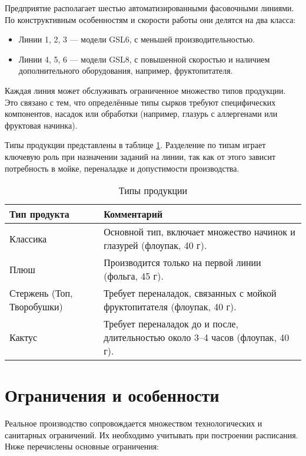 Предприятие располагает шестью автоматизированными фасовочными линиями. По конструктивным особенностям и скорости работы они делятся на два класса:
\begin{itemize}
    \item Линии 1, 2, 3 — модели GSL6, с меньшей производительностью.
    \item Линии 4, 5, 6 — модели GSL8, с повышенной скоростью и наличием дополнительного оборудования, например, фруктопитателя.
\end{itemize}

Каждая линия может обслуживать ограниченное множество типов продукции. Это связано с тем, что определённые типы сырков требуют специфических компонентов, насадок или обработки (например, глазурь с аллергенами или фруктовая начинка).

Типы продукции представлены в таблице \ref{table:ProductsType}. Разделение по типам играет ключевую роль при назначении заданий на линии, так как от этого зависит потребность в мойке, переналадке и допустимости производства.

\begin{table}[h]
\centering
\caption{Типы продукции}
\begin{tabularx}{\textwidth}{|l|X|}
\hline
\textbf{Тип продукта} & \textbf{Комментарий} \\
\hline
Классика                   & Основной тип, включает множество начинок и глазурей (флоупак, 40 г). \\
\hline
Плюш                       & Производится только на первой линии (фольга, 45 г). \\
\hline
Стержень (Топ, Творобушки) & Требует переналадок, связанных с мойкой фруктопитателя (флоупак, 40 г). \\
\hline
Кактус                     & Требует переналадок до и после, длительностью около 3--4 часов (флоупак, 40 г). \\
\hline
\end{tabularx}
\label{table:ProductsType}
\end{table}

\section{Ограничения и особенности}

Реальное производство сопровождается множеством технологических и санитарных ограничений. Их необходимо учитывать при построении расписания. Ниже перечислены основные ограничения:

